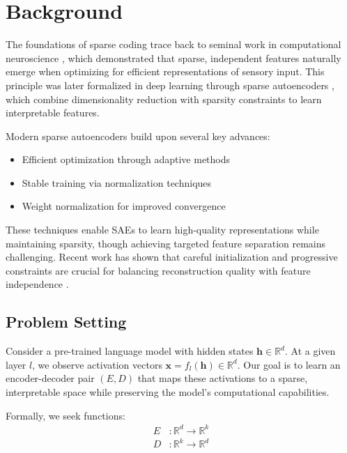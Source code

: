 \documentclass{article} %
\begin{document}
\section{Background}
\label{sec:background}

The foundations of sparse coding trace back to seminal work in computational neuroscience \cite{Olshausen1996EmergenceOS}, which demonstrated that sparse, independent features naturally emerge when optimizing for efficient representations of sensory input. This principle was later formalized in deep learning through sparse autoencoders \cite{Bengio2007LearningDA}, which combine dimensionality reduction with sparsity constraints to learn interpretable features.

Modern sparse autoencoders build upon several key advances:
\begin{itemize}
    \item Efficient optimization through adaptive methods \cite{kingma2014adam}
    \item Stable training via normalization techniques \cite{ba2016layer}
    \item Weight normalization for improved convergence \cite{Salimans2016WeightNA}
\end{itemize}

These techniques enable SAEs to learn high-quality representations while maintaining sparsity, though achieving targeted feature separation remains challenging. Recent work has shown that careful initialization and progressive constraints are crucial for balancing reconstruction quality with feature independence \cite{Suteu2019RegularizingDM}.

\subsection{Problem Setting}
Consider a pre-trained language model with hidden states $\mathbf{h} \in \mathbb{R}^d$. At a given layer $l$, we observe activation vectors $\mathbf{x} = f_l(\mathbf{h}) \in \mathbb{R}^d$. Our goal is to learn an encoder-decoder pair $(E,D)$ that maps these activations to a sparse, interpretable space while preserving the model's computational capabilities.

Formally, we seek functions:
\begin{align*}
    E &: \mathbb{R}^d \rightarrow \mathbb{R}^k \\
    D &: \mathbb{R}^k \rightarrow \mathbb{R}^d
\end{align*}
\end{document}
